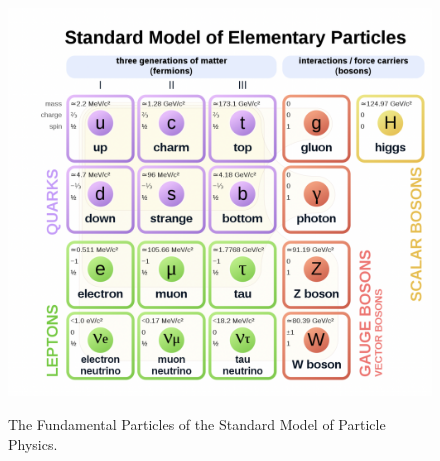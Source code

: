 




\begin{figure}[!htbp]
    \centering
    \caption{The Fundamental Particles of the Standard Model of Particle Physics.}
    \includegraphics[scale=0.7]{fig/CreativeCommonsSM.png}
    \label{fig:SMTable}
\end{figure}

